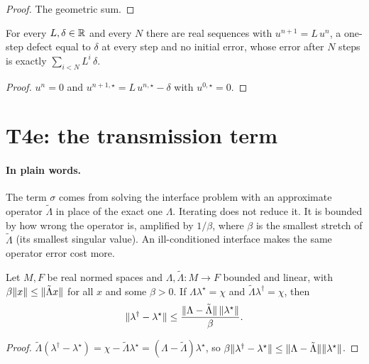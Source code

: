 \begin{proof}
  \leanok
  The geometric sum.
\end{proof}

\begin{proposition}\label{prop:T4-attained}
  \leanok
  For every $L,\delta\in\mathbb{R}$ and every $N$ there are real sequences with
  $u^{n+1}=L\,u^n$, a one-step defect equal to $\delta$ at every step and no
  initial error, whose error after $N$ steps is exactly
  $\sum_{i<N}L^i\,\delta$.
\end{proposition}

\begin{proof}
  \leanok
  $u^n=0$ and $u^{n+1,\star}=L\,u^{n,\star}-\delta$ with $u^{0,\star}=0$.
\end{proof}

\section{T4e: the transmission term}

\paragraph{In plain words.}
The term $\sigma$ comes from solving the interface problem with an approximate
operator $\tilde\Lambda$ in place of the exact one $\Lambda$.  Iterating does
not reduce it.  It is bounded by how wrong the operator is, amplified by
$1/\beta$, where $\beta$ is the smallest stretch of $\tilde\Lambda$ (its
smallest singular value).  An ill-conditioned interface makes the same operator
error cost more.

\begin{lemma}\label{lem:T4e-trace}
  \leanok
  Let $M,F$ be real normed spaces and $\Lambda,\tilde\Lambda:M\to F$ bounded and
  linear, with $\beta\lVert x\rVert\le\lVert \tilde\Lambda x\rVert$ for all $x$ and some
  $\beta>0$.  If $\Lambda\lambda^\star=\chi$ and
  $\tilde\Lambda\lambda^\dagger=\chi$, then
  \[
    \lVert \lambda^\dagger-\lambda^\star\rVert
      \le\frac{\lVert \Lambda-\tilde\Lambda\rVert\,\lVert \lambda^\star\rVert}{\beta}.
  \]
\end{lemma}

\begin{proof}
  \leanok
  $\tilde\Lambda(\lambda^\dagger-\lambda^\star)=\chi-\tilde\Lambda\lambda^\star
  =(\Lambda-\tilde\Lambda)\lambda^\star$, so
  $\beta\lVert \lambda^\dagger-\lambda^\star\rVert
  \le\lVert \Lambda-\tilde\Lambda\rVert\lVert \lambda^\star\rVert$.
\end{proof}

